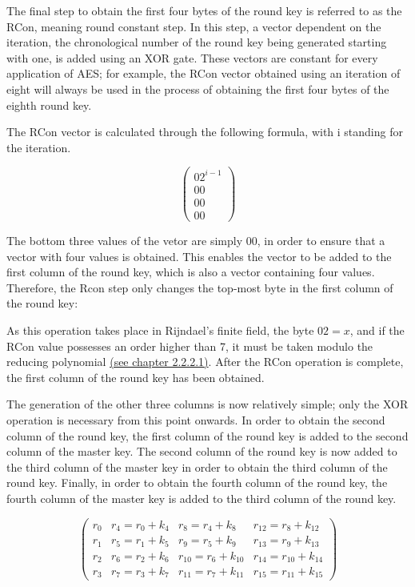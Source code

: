 \documentclass[12pt, a4paper]{report}
\theoremstyle{definition}
\theoremstyle{remark}
\begin{document}
The final step to obtain the first four bytes of the round key is referred to as the RCon, meaning round constant step\cite{Rijndael}. In this step, a vector dependent on the iteration, the chronological number of the round key being generated starting with one, is added using an XOR gate. These vectors are constant for every application of AES; for example, the RCon vector obtained using an iteration of eight will always be used in the process of obtaining the first four bytes of the eighth round key.

The RCon vector is calculated through the following formula, with i standing for the iteration.

\[ \left( \begin{array}{c}
{02}^{i-1}\\
00 \\
00 \\
00\end{array} \right) \]

The bottom three values of the vetor are simply 00, in order to ensure that a vector with four values is obtained. This enables the vector to be added to the first column of the round key, which is also a vector containing four values. Therefore, the Rcon step only changes the top-most byte in the first column of the round key:

As this operation takes place in Rijndael's finite field, the byte ${02} = x$, and if the RCon value possesses an order higher than 7, it must be taken modulo the reducing polynomial \hyperref[Galois]{(see chapter 2.2.2.1)}. After the RCon operation is complete, the first column of the round key has been obtained.

The generation of the other three columns is now relatively simple; only the XOR operation is necessary from this point onwards. In order to obtain the second column of the round key, the first column of the round key is added to the second column of the master key. The second column of the round key is now added to the third column of the master key in order to obtain the third column of the round key. Finally, in order to obtain the fourth column of the round key, the fourth column of the master key is added to the third column of the round key.

\[ \left( \begin{array}{cccc}
r_0 & r_4=r_0+k_4 & r_8=r_4+k_8 & r_{12}=r_8+k_{12} \\
r_1 & r_5=r_1+k_5 & r_9=r_5+k_9 & r_{13}=r_9+k_{13} \\
r_2 & r_6=r_2+k_6 & r_{10}=r_6+k_{10} & r_{14}=r_{10}+k_{14} \\
r_3 & r_7=r_3+k_7 & r_{11}=r_7+k_{11} & r_{15}=r_{11}+k_{15}\end{array} \right) \]
\end{document}
